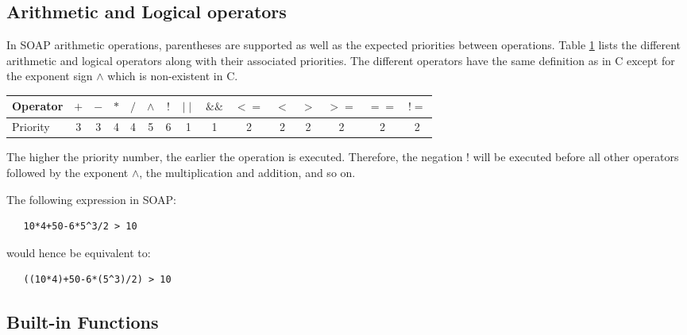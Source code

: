 \documentclass{warpdoc}
\newcommand{\tablespacing}{\vspace{-0.4cm}}
\renewcommand{\fontsizetable}{\footnotesize\scalefont{1.0}}
\begin{document}
\subsection{Arithmetic and Logical operators}

In SOAP arithmetic operations, parentheses are supported as well as the expected priorities between operations.
Table \ref{table:operators} lists the different arithmetic and logical
operators along with their associated priorities. The different operators have the same
definition as in C except for the exponent sign $\wedge$ which is
non-existent in C.
%
\begin{table}[ht]
\fontsizetable
\vspace{0.3cm}
\begin{center}
  \begin{threeparttable}
    \begin{tabular}{lcccccccccccccc}
      \toprule
Operator & $+$ & $-$ & $*$ & $/$ & $\wedge$ & $!$ & $\mid \mid$ & $\&\&$ & $<=$ & $<$ & $>$ & $>=$ & $==$ & $!=$\\
      \midrule
Priority & 3   & 3   & 4   & 4   & 5        & 6   & 1           & 1      & 2    & 2   & 2   & 2    & 2    & 2\\
      \bottomrule
    \end{tabular}
    \label{table:operators}
  \end{threeparttable}
\end{center}
\tablespacing
\end{table}
%
The higher the priority number, the earlier the operation is executed. Therefore,
the negation $!$ will be executed before all other operators followed by the
exponent $\wedge$, the multiplication and addition, and so on. 

The following expression in SOAP:
%
\begin{verbatim}
   10*4+50-6*5^3/2 > 10
\end{verbatim}
%
would hence be equivalent to:
%
\begin{verbatim}
   ((10*4)+50-6*(5^3)/2) > 10
\end{verbatim}
%



\subsection{Built-in Functions}
\end{document}
